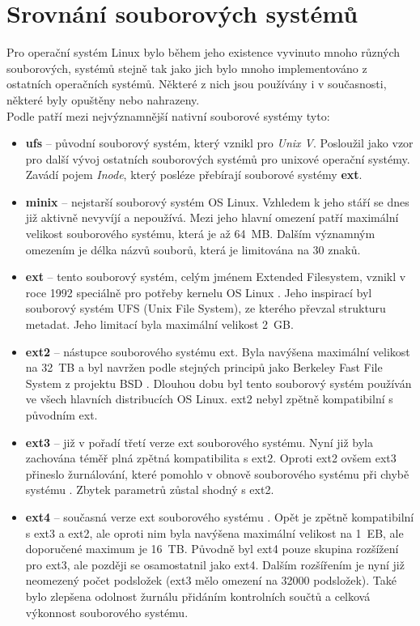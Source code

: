 \section{Srovnání souborových systémů}
Pro operační systém Linux bylo během jeho existence vyvinuto mnoho různých souborových, systémů stejně tak jako jich bylo mnoho implementováno z ostatních operačních systémů. Některé z nich jsou používány i v současnosti, některé byly opuštěny nebo nahrazeny.\\
Podle \cite{tldp-filesystem} patří mezi nejvýznamnější nativní souborové systémy tyto:
\begin{itemize}
    \item \textbf{ufs} -- původní souborový systém, který vznikl pro \textit{Unix V}. Posloužil jako vzor pro další vývoj ostatních souborových systémů pro unixové operační systémy. Zavádí pojem \textit{Inode}, který posléze přebírají souborové systémy \textbf{ext}.
    \item \textbf{minix} -- nejstarší souborový systém OS Linux. Vzhledem k jeho stáří se dnes již aktivně nevyvíjí a nepoužívá. Mezi jeho hlavní omezení patří maximální velikost souborového systému, která je až 64~MB. Dalším významným omezením je délka názvů souborů, která je limitována na 30 znaků.
    \item \textbf{ext} -- tento souborový systém, celým jménem Extended Filesystem, vznikl v roce 1992 speciálně pro potřeby kernelu OS Linux \cite{linmag-ext}. Jeho inspirací byl souborový systém UFS (Unix File System), ze kterého převzal strukturu metadat. Jeho limitací byla maximální velikost 2~GB.
    \item \textbf{ext2} -- nástupce souborového systému ext. Byla navýšena maximální velikost na 32~TB a byl navržen podle stejných principů jako Berkeley Fast File System z projektu BSD \cite{nongnu-ext2}. Dlouhou dobu byl tento souborový systém používán ve všech hlavních distribucích OS Linux. ext2 nebyl zpětně kompatibilní s původním ext.
    \item \textbf{ext3} -- již v pořadí třetí verze ext souborového systému. Nyní již byla zachována téměř plná zpětná kompatibilita s ext2. Oproti ext2 ovšem ext3 přineslo žurnálování, které pomohlo v obnově souborového systému při chybě systému \cite{paper-ext3}. Zbytek parametrů zůstal shodný s ext2.
    \item \textbf{ext4} -- současná verze ext souborového systému \cite{paper-ext4}. Opět je zpětně kompatibilní s ext3 a ext2, ale oproti nim byla navýšena maximální velikost na 1~EB, ale doporučené maximum je 16~TB. Původně byl ext4 pouze skupina rozšížení pro ext3, ale později se osamostatnil jako ext4. Dalším rozšířením je nyní již neomezený počet podsložek (ext3 mělo omezení na 32000 podsložek). Také bylo zlepšena odolnost žurnálu přidáním kontrolních součtů a celková výkonnost souborového systému.

\end{itemize}
